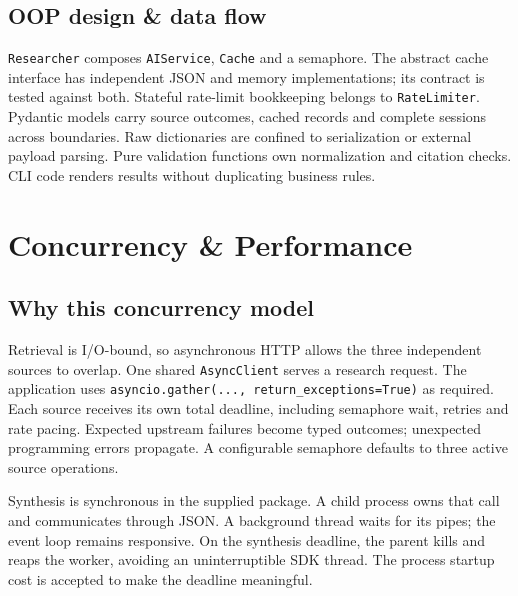 \documentclass[11pt,a4paper]{article}
\begin{document}
\subsection{OOP design \& data flow}
\texttt{Researcher} composes \texttt{AIService}, \texttt{Cache} and a semaphore. The abstract cache interface has independent JSON and memory implementations; its contract is tested against both. Stateful rate-limit bookkeeping belongs to \texttt{RateLimiter}. Pydantic models carry source outcomes, cached records and complete sessions across boundaries. Raw dictionaries are confined to serialization or external payload parsing. Pure validation functions own normalization and citation checks. CLI code renders results without duplicating business rules.

\clearpage
\section{Concurrency \& Performance}
\subsection{Why this concurrency model}
Retrieval is I/O-bound, so asynchronous HTTP allows the three independent sources to overlap. One shared \texttt{AsyncClient} serves a research request. The application uses \texttt{asyncio.gather(..., return\_exceptions=True)} as required. Each source receives its own total deadline, including semaphore wait, retries and rate pacing. Expected upstream failures become typed outcomes; unexpected programming errors propagate. A configurable semaphore defaults to three active source operations.

Synthesis is synchronous in the supplied package. A child process owns that call and communicates through JSON. A background thread waits for its pipes; the event loop remains responsive. On the synthesis deadline, the parent kills and reaps the worker, avoiding an uninterruptible SDK thread. The process startup cost is accepted to make the deadline meaningful.
\end{document}
